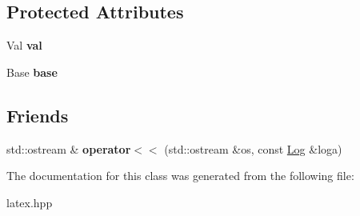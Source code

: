 \subsection*{Protected Attributes}
\begin{DoxyCompactItemize}
\item 
\hypertarget{classlatex_1_1math_1_1Log_a7f4ac09a355183bcec59b0f7fe686f43}{Val {\bfseries val}}\label{classlatex_1_1math_1_1Log_a7f4ac09a355183bcec59b0f7fe686f43}

\item 
\hypertarget{classlatex_1_1math_1_1Log_a487bc150b50dd56998b2541ae5c335ab}{Base {\bfseries base}}\label{classlatex_1_1math_1_1Log_a487bc150b50dd56998b2541ae5c335ab}

\end{DoxyCompactItemize}
\subsection*{Friends}
\begin{DoxyCompactItemize}
\item 
\hypertarget{classlatex_1_1math_1_1Log_ab9f88137b0d5fb0ab0f04bf4003514fe}{std\-::ostream \& {\bfseries operator$<$$<$} (std\-::ostream \&os, const \hyperlink{classlatex_1_1math_1_1Log}{Log} \&loga)}\label{classlatex_1_1math_1_1Log_ab9f88137b0d5fb0ab0f04bf4003514fe}

\end{DoxyCompactItemize}


The documentation for this class was generated from the following file\-:\begin{DoxyCompactItemize}
\item 
latex.\-hpp\end{DoxyCompactItemize}
